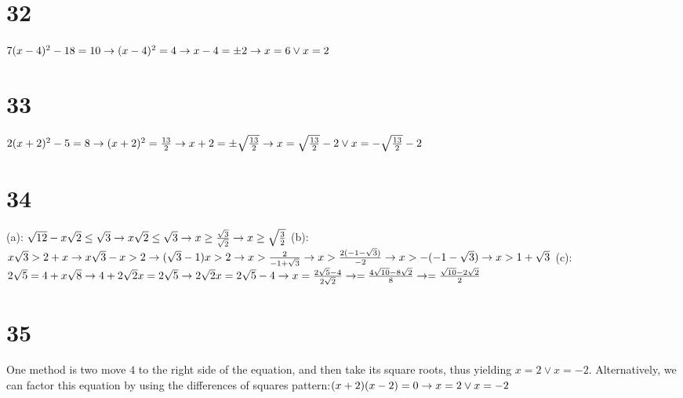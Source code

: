 \documentclass{article}
\theoremstyle{definition}
\begin{document}
\section*{32}
$7(x-4)^2-18=10\newline\rightarrow (x-4)^2=4\newline\rightarrow x-4=\pm 2\newline\rightarrow x=6\vee x=2$

\section*{33}
$2(x+2)^2-5=8\newline\rightarrow (x+2)^2=\frac{13}{2}\newline\rightarrow x+2=\pm\sqrt\frac{13}{2}\newline\rightarrow x=\sqrt\frac{13}{2}-2\vee 
x=-\sqrt\frac{13}{2}-2$

\section*{34}
(a): $\sqrt{12}-x\sqrt{2}\le \sqrt{3}\newline\rightarrow x\sqrt{2}\le \sqrt{3}\newline\rightarrow x\ge \frac{\sqrt{3}}{\sqrt{2}}\newline\rightarrow 
x\ge \sqrt\frac{3}{2}$\newline
(b): $x\sqrt{3}>2+x\newline\rightarrow x\sqrt{3}-x>2\newline\rightarrow (\sqrt{3}-1)x>2\newline\rightarrow x>\frac{2}{-1+\sqrt{3}}\newline\rightarrow 
x>\frac{2(-1-\sqrt{3})}{-2}\newline\rightarrow x>-(-1-\sqrt{3})\newline\rightarrow x>1+\sqrt{3}$\newline
(c): $2\sqrt{5}=4+x\sqrt{8}\newline\rightarrow 4+2\sqrt{2}x=2\sqrt{5}\newline\rightarrow 2\sqrt{2}x=2\sqrt{5}-4\newline\rightarrow 
x=\frac{2\sqrt{5}-4}{2\sqrt{2}}\newline\rightarrow =\frac{4\sqrt{10}-8\sqrt{2}}{8}\newline\rightarrow =\frac{\sqrt{10}-2\sqrt{2}}{2}$

\section*{35}
One method is two move $4$ to the right side of the equation, and then take its square roots, thus yielding $x=2\vee x=-2$. Alternatively, we 
can factor this equation by using the differences of squares pattern:\newline $(x+2)(x-2)=0\newline\rightarrow x=2\vee x=-2$
\end{document}
